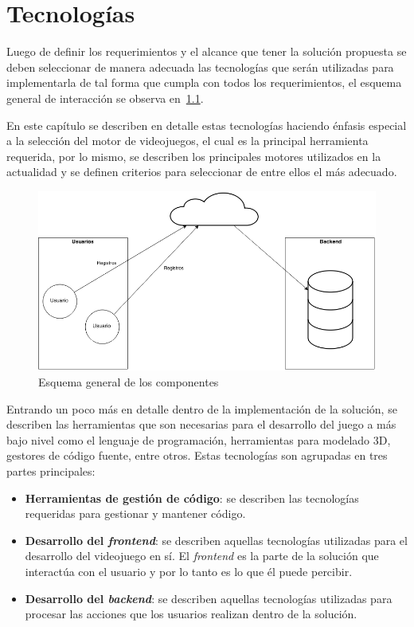 \chapter{Tecnologías}
\label{chap:tecnologias}

Luego de definir los requerimientos y el alcance que tener la solución propuesta se
deben seleccionar de manera adecuada las tecnologías que serán utilizadas para
implementarla de tal forma que cumpla con todos los requerimientos, el esquema
general de interacción se observa en~\ref{fig:componentes}.

En este capítulo se describen en detalle estas tecnologías haciendo énfasis especial a 
la selección del motor de videojuegos, el cual es la principal herramienta requerida, por 
lo mismo, se describen los principales motores utilizados en la actualidad y se definen 
criterios para seleccionar de entre ellos el más adecuado.


\begin{figure}
\begin{center}
    \includegraphics[scale=0.5]{tecnologias/images/completo.png}
\end{center}
\caption{Esquema general de los componentes}
\label{fig:componentes}
\end{figure}

Entrando un poco más en detalle dentro de la implementación de la solución, se describen 
las herramientas que son necesarias para el desarrollo del juego a más bajo nivel como el 
lenguaje de programación, herramientas para modelado 3D, gestores de código
fuente, entre otros. Estas tecnologías son agrupadas en tres partes principales:

\begin{itemize}
    \item \textbf{Herramientas de gestión de código}: se describen las
        tecnologías requeridas para gestionar y mantener código.
    \item \textbf{Desarrollo del \textit{frontend}}: se describen aquellas tecnologías
        utilizadas para el desarrollo del videojuego en sí. El \textit{frontend} es la
        parte de la solución que interactúa con el usuario y por lo tanto es lo
        que él puede percibir.
    \item \textbf{Desarrollo del \textit{backend}}: se describen aquellas tecnologías
        utilizadas para procesar las acciones que los usuarios realizan dentro
        de la solución.
\end{itemize}

